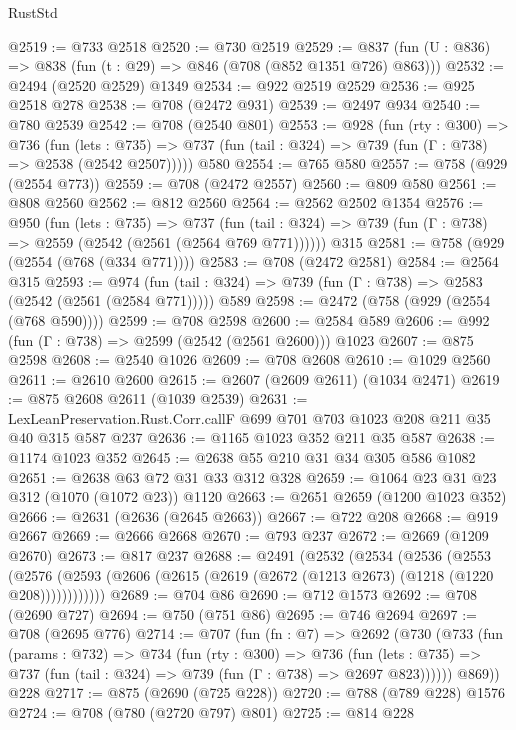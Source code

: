 \begin{lexlean}{RustStd}
\begin{coremodule}
@2519 := @733 @2518
@2520 := @730 @2519
@2529 := @837 (fun (U : @836) => @838 (fun (t : @29) => @846 (@708 (@852 @1351 @726) @863)))
@2532 := @2494 (@2520 @2529) @1349
@2534 := @922 @2519 @2529
@2536 := @925 @2518 @278
@2538 := @708 (@2472 @931)
@2539 := @2497 @934
@2540 := @780 @2539
@2542 := @708 (@2540 @801)
@2553 := @928
    (fun (rty : @300) =>
    @736
      (fun (lets : @735) =>
      @737 (fun (tail : @324) => @739 (fun (Γ : @738) => @2538 (@2542 @2507)))))
    @580
@2554 := @765 @580
@2557 := @758 (@929 (@2554 @773))
@2559 := @708 (@2472 @2557)
@2560 := @809 @580
@2561 := @808 @2560
@2562 := @812 @2560
@2564 := @2562 @2502 @1354
@2576 := @950
    (fun (lets : @735) =>
    @737 (fun (tail : @324) => @739 (fun (Γ : @738) => @2559 (@2542 (@2561 (@2564 @769 @771))))))
    @315
@2581 := @758 (@929 (@2554 (@768 (@334 @771))))
@2583 := @708 (@2472 @2581)
@2584 := @2564 @315
@2593 := @974
    (fun (tail : @324) => @739 (fun (Γ : @738) => @2583 (@2542 (@2561 (@2584 @771)))))
    @589
@2598 := @2472 (@758 (@929 (@2554 (@768 @590))))
@2599 := @708 @2598
@2600 := @2584 @589
@2606 := @992 (fun (Γ : @738) => @2599 (@2542 (@2561 @2600))) @1023
@2607 := @875 @2598
@2608 := @2540 @1026
@2609 := @708 @2608
@2610 := @1029 @2560
@2611 := @2610 @2600
@2615 := @2607 (@2609 @2611) (@1034 @2471)
@2619 := @875 @2608 @2611 (@1039 @2539)
@2631 := LexLeanPreservation.Rust.Corr.callF @699 @701 @703 @1023 @208 @211 @35 @40 @315 @587 @237
@2636 := @1165 @1023 @352 @211 @35 @587
@2638 := @1174 @1023 @352
@2645 := @2638 @55 @210 @31 @34 @305 @586 @1082
@2651 := @2638 @63 @72 @31 @33 @312 @328
@2659 := @1064 @23 @31 @23 @312 (@1070 (@1072 @23)) @1120
@2663 := @2651 @2659 (@1200 @1023 @352)
@2666 := @2631 (@2636 (@2645 @2663))
@2667 := @722 @208
@2668 := @919 @2667
@2669 := @2666 @2668
@2670 := @793 @237
@2672 := @2669 (@1209 @2670)
@2673 := @817 @237
@2688 := @2491
    (@2532
      (@2534
        (@2536
          (@2553
            (@2576 (@2593 (@2606 (@2615 (@2619 (@2672 (@1213 @2673) (@1218 (@1220 @208))))))))))))
@2689 := @704 @86
@2690 := @712 @1573
@2692 := @708 (@2690 @727)
@2694 := @750 (@751 @86)
@2695 := @746 @2694
@2697 := @708 (@2695 @776)
@2714 := @707
    (fun (fn : @7) =>
    @2692
      (@730
        (@733
          (fun (params : @732) =>
          @734
            (fun (rty : @300) =>
            @736
              (fun (lets : @735) =>
              @737 (fun (tail : @324) => @739 (fun (Γ : @738) => @2697 @823))))))
        @869))
    @228
@2717 := @875 (@2690 (@725 @228))
@2720 := @788 (@789 @228) @1576
@2724 := @708 (@780 (@2720 @797) @801)
@2725 := @814 @228

\end{coremodule}
\end{lexlean}
